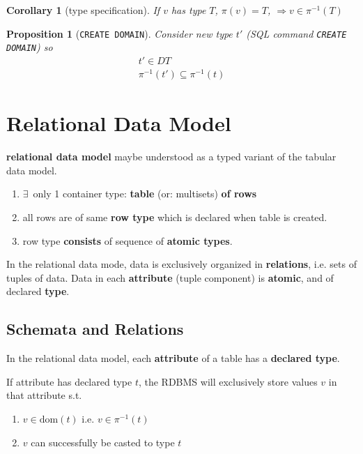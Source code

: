 \documentclass[10pt]{amsart}
\newtheorem{corollary}{Corollary}
\newtheorem{proposition}{Proposition}
\begin{document}
\begin{multicols*}{2}
\begin{corollary}[type specification]
	If $v$ has type $T$, $\pi(v) = T$, $\Longrightarrow v \in \pi^{-1}(T)$
\end{corollary}

\begin{proposition}[\texttt{CREATE DOMAIN}]
	Consider new type $t'$ (SQL command \texttt{CREATE DOMAIN}) so 
	\begin{equation}
	\begin{gathered}
	t' \in DT \\
	\pi^{-1}(t') \subseteq \pi^{-1}(t)
	\end{gathered}
	\end{equation}
\end{proposition}


\section{Relational Data Model}

	\textbf{relational data model} maybe understood as a typed variant of the tabular data model. 
	\begin{enumerate}
		\item $\exists \, $ only 1 container type: \textbf{table} (or: multisets) \textbf{ of rows}
		\item all rows are of same \textbf{row type} which is declared when table is created.
		\item row type \textbf{consists} of sequence of \textbf{atomic types}.
	\end{enumerate}

In the relational data mode, data is exclusively organized in \textbf{relations}, i.e. sets of tuples of data. Data in each \textbf{attribute} (tuple component) is \textbf{atomic}, and of declared \textbf{type}.

\subsection{Schemata and Relations}

In the relational data model, each \textbf{attribute} of a table has a \textbf{declared type}.

If attribute has declared type $t$, the RDBMS will exclusively store values $v$ in that attribute s.t. 
\begin{enumerate}
	\item $v \in \text{dom}(t)$ i.e. $v \in \pi^{-1}(t)$
	\item $v$ can successfully be casted to type $t$
\end{enumerate}


\end{multicols*}
\end{document}
